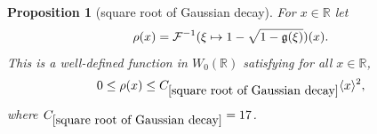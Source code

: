 \documentclass[12pt,reqno]{amsart}
\theoremstyle{plain}
\newtheorem{proposition}[theorem]{Proposition}
\numberwithin{equation}{section}
\theoremstyle{remark}
\newcommand{\uses}[1]{}
\newcommand{\usesdefs}[1]{}
\newcommand{\R}{{\mathbb R}}
\begin{document}
\begin{proposition}[square root of Gaussian decay]\label{square root of Gaussian decay}\uses{auxiliary function B,poisson to abel,Elementary Gaussian properties}\usesdefs{gaussian,bracket bump,auto:Wiener-space-definition}
For $x\in\R$ let
\begin{equation}\label{auto:inverse-Fourier-square-root-Gaussian} \rho(x) = \mathcal{F}^{-1}(\xi \mapsto 1- \sqrt{1-\mathfrak{g}(\xi)})(x). \end{equation}
This is a well-defined function in $W_0(\R)$ satisfying for all $x\in\R$,
\begin{equation} \label{sqr gauss C}
    0\le \rho(x) \le C_{\ref{square root of Gaussian decay}} \langle x\rangle^2,
\end{equation}
where $C_{\ref{square root of Gaussian decay}}=17$.
\end{proposition}
\end{document}
